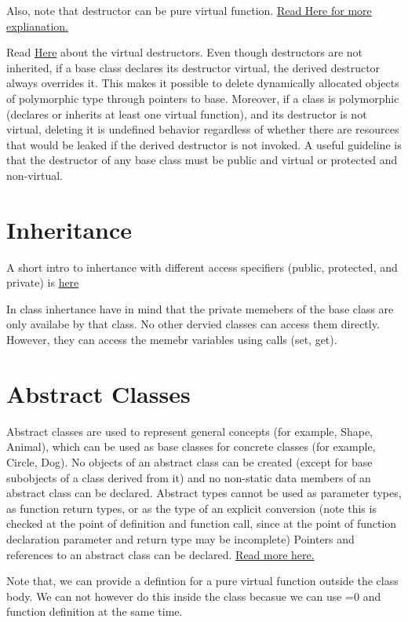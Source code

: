 \documentclass[11pt,twoside,a4paper]{report}
\begin{document}
Also, note that destructor can be pure virtual function. \href{https://en.cppreference.com/w/cpp/language/abstract_class}{Read Here for more explianation.}

Read \href{https://en.cppreference.com/w/cpp/language/virtual}{Here} about the virtual destructors.
Even though destructors are not inherited, if a base class declares its destructor virtual, the derived destructor always overrides it. This makes it possible to delete dynamically allocated objects of polymorphic type through pointers to base.
Moreover, if a class is polymorphic (declares or inherits at least one virtual function), and its destructor is not virtual, deleting it is undefined behavior regardless of whether there are resources that would be leaked if the derived destructor is not invoked.
A useful guideline is that the destructor of any base class must be public and virtual or protected and non-virtual.

\section{Inheritance}
A short intro to inhertance with different access specifiers (public, protected, and private) is \href{https://www.tutorialspoint.com/cplusplus/cpp_inheritance.htm}{here}

In class inhertance have in mind that the private memebers of the base class are only availabe by that class. No other dervied classes can access them directly. However, they can access the memebr variables using calls (set, get).
\section{Abstract Classes}
Abstract classes are used to represent general concepts (for example, Shape, Animal), which can be used as base classes for concrete classes (for example, Circle, Dog).
No objects of an abstract class can be created (except for base subobjects of a class derived from it) and no non-static data members of an abstract class can be declared.
Abstract types cannot be used as parameter types, as function return types, or as the type of an explicit conversion (note this is checked at the point of definition and function call, since at the point of function declaration parameter and return type may be incomplete)
Pointers and references to an abstract class can be declared. \href{https://en.cppreference.com/w/cpp/language/abstract_class}{Read more here.}

Note that, we can provide a defintion for a pure virtual function outside the class body. We can not however do this inside the class becasue we can use =0 and function definition at the same time.
\end{document}
